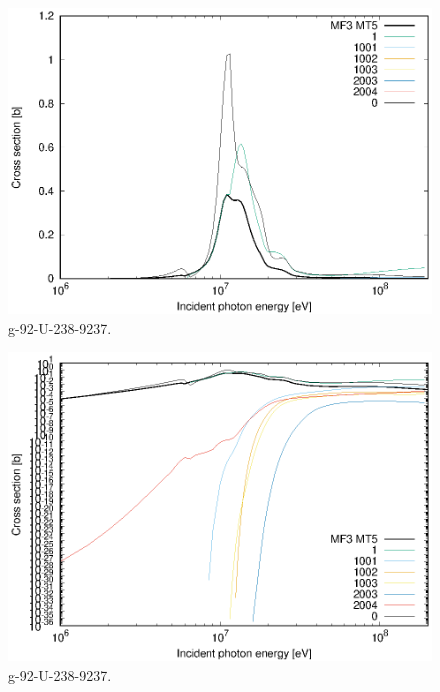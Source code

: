 \begin{figure}
 \includegraphics[width=\linewidth]{eps/g_92-U-238_9237.eps}
  \caption{g-92-U-238-9237.}
\end{figure}
\begin{figure}
 \includegraphics[width=\linewidth]{eps-log/g_92-U-238_9237.eps}
 \caption{g-92-U-238-9237.}
\end{figure}
\newpage \clearpage

